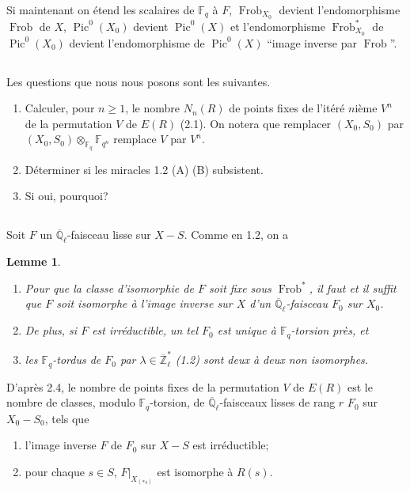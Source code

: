 \documentclass[11pt,a4paper]{article}
\theoremstyle{plain}
\newtheorem{lemme}[theorem]{Lemme}
\theoremstyle{definition}
\DeclareMathOperator{\Pic}{Pic}
\DeclareMathOperator{\Frob}{Frob}
\newcommand{\F}{\mathbb{F}}
\newcommand{\Ql}{\overline{\mathbb{Q}}_\ell}
\newcommand{\Zl}{\overline{\mathbb{Z}}_\ell}
\begin{document}
Si maintenant on \'etend les scalaires de $\F_q$ \`a $F$, $\Frob_{X_0}$ devient l'endomorphisme $\Frob$ de $X$, $\Pic^0(X_0)$ devient $\Pic^0(X)$ et l'endomorphisme $\Frob_{X_0}^*$ de $\Pic^0(X_0)$ devient l'endomorphisme de $\Pic^0(X)$ ``image inverse par $\Frob$''.

\subsection{}
Les questions que nous nous posons sont les suivantes.

\begin{enumerate}[label=(\roman*)]
\item Calculer, pour $n \geq 1$, le nombre $N_n(R)$ de points fixes de l'it\'er\'e $n$i\`eme $V^n$ de la permutation $V$ de $E(R)$ (2.1). On notera que remplacer $(X_0, S_0)$ par $(X_0, S_0) \otimes_{\F_q} \F_{q^n}$ remplace $V$ par $V^n$.
\item D\'eterminer si les miracles 1.2 (A) (B) subsistent.
\item Si oui, pourquoi?
\end{enumerate}

\subsection{}
Soit $F$ un $\Ql$-faisceau lisse sur $X - S$. Comme en 1.2, on a

\begin{lemme}
\begin{enumerate}[label=(\roman*)]
\item Pour que la classe d'isomorphie de $F$ soit fixe sous $\Frob^*$, il faut et il suffit que $F$ soit isomorphe \`a l'image inverse sur $X$ d'un $\Ql$-faisceau $F_0$ sur $X_0$.
\item De plus, si $F$ est irr\'eductible, un tel $F_0$ est unique \`a $\F_q$-torsion pr\`es, et
\item les $\F_q$-tordus de $F_0$ par $\lambda \in \Zl^*$ (1.2) sont deux \`a deux non isomorphes.
\end{enumerate}
\end{lemme}

D'apr\`es 2.4, le nombre de points fixes de la permutation $V$ de $E(R)$ est le nombre de classes, modulo $\F_q$-torsion, de $\Ql$-faisceaux lisses de rang $r$ $F_0$ sur $X_0 - S_0$, tels que
\begin{enumerate}[label=(\alph*)]
\item l'image inverse $F$ de $F_0$ sur $X - S$ est irr\'eductible;
\item pour chaque $s \in S$, $F|_{X_{(*s)}}$ est isomorphe \`a $R(s)$.
\end{enumerate}
\end{document}
